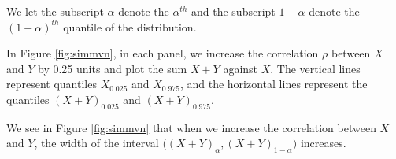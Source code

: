 \documentclass[12pt,twoside]{smiththesis}
\begin{document}
We let the subscript \(\alpha\) denote the \(\alpha^{th}\) and the subscript \(1-\alpha\) denote the \((1-\alpha)^{th}\) quantile of the distribution.

In Figure \ref{fig:simmvn}, in each panel, we increase the correlation \(\rho\) between \(X\) and \(Y\) by 0.25 units and plot the sum \(X +Y\) against \(X\). The vertical lines represent quantiles \(X_{0.025}\) and \(X_{0.975}\), and the horizontal lines represent the quantiles \((X+Y)_{0.025}\) and \((X+Y)_{0.975}\).

We see in Figure \ref{fig:simmvn} that when we increase the correlation between \(X\) and \(Y\), the width of the interval \(\Big((X+Y)_\alpha, (X+Y)_{1-\alpha}\Big)\) increases.

~

~

~

~

~

~

~

~

~

~

~

~

~

~

~

~

~

~

~

~
\end{document}
